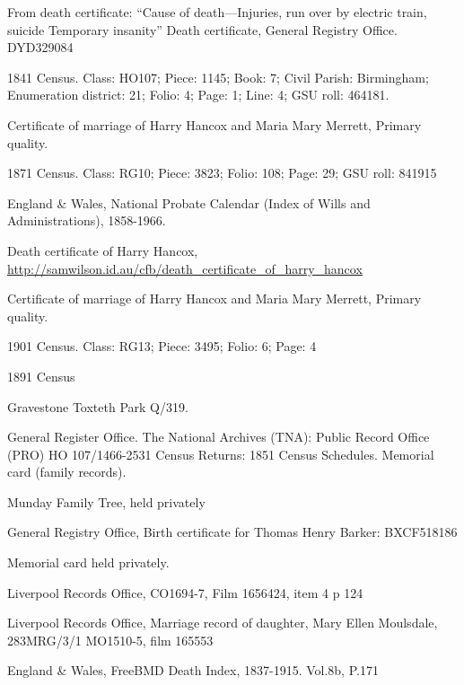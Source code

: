 \begin{thebibliography}{99}
	From death certificate: ``Cause of death---Injuries, run over by electric train, suicide Temporary insanity''
	Death certificate, General Registry Office. DYD329084

	1841 Census. 
	Class: HO107; Piece: 1145; Book: 7; Civil Parish: Birmingham; Enumeration district: 21; Folio: 4; Page: 1; Line: 4; GSU roll: 464181.

	Certificate of marriage of Harry Hancox and Maria Mary Merrett, Primary quality. 

	1871 Census.
	Class: RG10; Piece: 3823; Folio: 108; Page: 29; GSU roll: 841915

	England \& Wales, National Probate Calendar (Index of Wills and Administrations), 1858-1966.

	Death certificate of Harry Hancox,
	\url{http://samwilson.id.au/cfb/death_certificate_of_harry_hancox}

	Certificate of marriage of Harry Hancox and Maria Mary Merrett, Primary quality.

	1901 Census.
	Class: RG13; Piece: 3495; Folio: 6; Page: 4

	1891 Census
	
	Gravestone Toxteth Park Q/319. 
	
	General Register Office. The National Archives (TNA): Public Record Office (PRO) HO 107/1466-2531 Census Returns: 1851 Census Schedules.
	Memorial card (family records). 
	
	Munday Family Tree, held privately

	 General Registry Office, Birth certificate for Thomas Henry Barker: BXCF518186
	 
	 Memorial card held privately.
	 
	Liverpool Records Office, CO1694-7, Film 1656424, item 4 p 124

	Liverpool Records Office, Marriage record of daughter, Mary Ellen Moulsdale, 283MRG/3/1 MO1510-5, film 165553

	England \& Wales, FreeBMD Death Index, 1837-1915. Vol.8b, P.171
	

\end{thebibliography}
